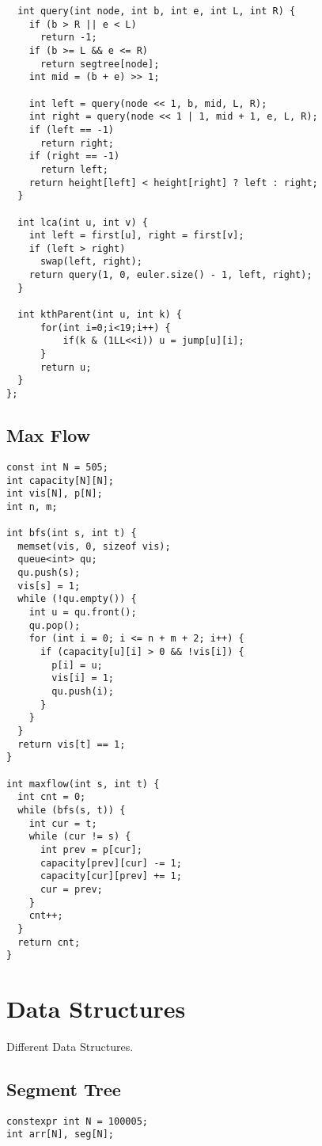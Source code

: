 \documentclass[10pt, a4paper]{article}
\begin{document}
\begin{multicols}{2}
\begin{lstlisting}
  int query(int node, int b, int e, int L, int R) {
    if (b > R || e < L)
      return -1;
    if (b >= L && e <= R)
      return segtree[node];
    int mid = (b + e) >> 1;

    int left = query(node << 1, b, mid, L, R);
    int right = query(node << 1 | 1, mid + 1, e, L, R);
    if (left == -1)
      return right;
    if (right == -1)
      return left;
    return height[left] < height[right] ? left : right;
  }

  int lca(int u, int v) {
    int left = first[u], right = first[v];
    if (left > right)
      swap(left, right);
    return query(1, 0, euler.size() - 1, left, right);
  }

  int kthParent(int u, int k) {
      for(int i=0;i<19;i++) {
          if(k & (1LL<<i)) u = jump[u][i];
      }
      return u;
  }
};
\end{lstlisting}
\subsection{Max Flow}
\begin{lstlisting}
const int N = 505;
int capacity[N][N];
int vis[N], p[N];
int n, m;

int bfs(int s, int t) {
  memset(vis, 0, sizeof vis);
  queue<int> qu;
  qu.push(s);
  vis[s] = 1;
  while (!qu.empty()) {
    int u = qu.front();
    qu.pop();
    for (int i = 0; i <= n + m + 2; i++) {
      if (capacity[u][i] > 0 && !vis[i]) {
        p[i] = u;
        vis[i] = 1;
        qu.push(i);
      }
    }
  }
  return vis[t] == 1;
}

int maxflow(int s, int t) {
  int cnt = 0;
  while (bfs(s, t)) {
    int cur = t;
    while (cur != s) {
      int prev = p[cur];
      capacity[prev][cur] -= 1;
      capacity[cur][prev] += 1;
      cur = prev;
    }
    cnt++;
  }
  return cnt;
}
\end{lstlisting}
\section{Data Structures}
Different Data Structures.
\subsection{Segment Tree}
\begin{lstlisting}
constexpr int N = 100005;
int arr[N], seg[N];


\end{lstlisting}
\end{multicols}
\end{document}
